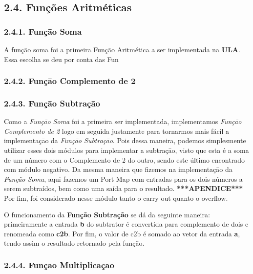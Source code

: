 \subsection*{2.4. Funções Aritméticas}

\subsubsection*{2.4.1. Funçāo Soma}

A função soma foi a primeira Função Aritmética a ser implementada na \textbf{ULA}. Essa escolha se deu por conta das Fun


\subsubsection*{2.4.2. Funçāo Complemento de 2}

\subsubsection*{2.4.3. Funçāo Subtraçāo}

Como a \textit{Funçāo Soma} foi a primeira ser implementada, implementamos \textit{Funçāo Complemento de 2} logo em seguida justamente para tornarmos mais fácil a implementaçāo da \textit{Funçāo Subtraçāo}. Pois dessa maneira, podemos simplesmente utilizar esses dois módulos para implementar a subtraçāo, visto que esta é a soma de um número com o Complemento de 2 do outro, sendo este último encontrado com módulo negativo. Da mesma maneira que fizemos na implementaçāo da \textit{Função Soma}, aqui fazemos um Port Map com entradas para os dois números a serem subtraídos, bem como uma saída para o resultado. \textbf{***APENDICE***} Por fim, foi considerado nesse módulo tanto o carry out quanto o overflow.

O funcionamento da \textbf{Função Subtração} se dá da seguinte maneira: primeiramente a entrada \textbf{b} do subtrator é convertida para complemento de dois e renomeada como \textbf{c2b}. Por fim, o valor de c2b é somado ao vetor da entrada \textbf{a}, tendo assim o resultado retornado pela função.


\subsubsection*{2.4.4. Funçāo Multiplicaçāo}


%
